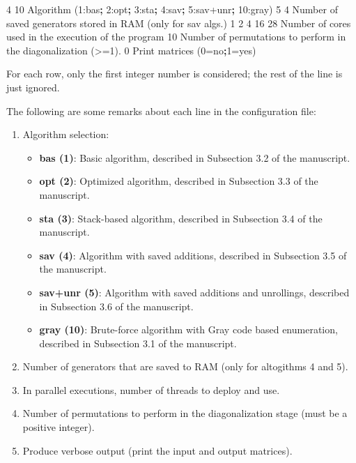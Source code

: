 \documentclass[]{article}
\newenvironment{Shaded}{}{}
\newcommand{\ExtensionTok}[1]{#1}
\newcommand{\KeywordTok}[1]{\textcolor[rgb]{0.00,0.44,0.13}{\textbf{#1}}}
\newcommand{\NormalTok}[1]{#1}
\newcommand{\OperatorTok}[1]{\textcolor[rgb]{0.40,0.40,0.40}{#1}}
\providecommand{\tightlist}{%
  \setlength{\itemsep}{0pt}\setlength{\parskip}{0pt}}
\begin{document}
\begin{Shaded}
\begin{Highlighting}[]
\ExtensionTok{4}\NormalTok{ 10         Algorithm (1:bas}\KeywordTok{;} \ExtensionTok{2}\NormalTok{:opt}\KeywordTok{;} \ExtensionTok{3}\NormalTok{:sta}\KeywordTok{;} \ExtensionTok{4}\NormalTok{:sav}\KeywordTok{;} \ExtensionTok{5}\NormalTok{:sav+unr}\KeywordTok{;} \ExtensionTok{10}\NormalTok{:gray)}
 \ExtensionTok{5}\NormalTok{ 4         Number of saved generators stored in RAM (only for sav algs.)}
\ExtensionTok{1}\NormalTok{ 2 4 16 28  Number of cores used in the execution of the program}
 \ExtensionTok{10}\NormalTok{          Number of permutations to perform in the diagonalization (}\OperatorTok{>}\NormalTok{=1)}\ExtensionTok{.}
\ExtensionTok{0}\NormalTok{            Print matrices (0=no}\KeywordTok{;}\ExtensionTok{1}\NormalTok{=yes)}
\end{Highlighting}
\end{Shaded}

For each row, only the first integer number is considered; the rest of
the line is just ignored.

The following are some remarks about each line in the configuration
file:

\begin{enumerate}
\def\labelenumi{\arabic{enumi}.}
\item
  Algorithm selection:

  \begin{itemize}
  \tightlist
  \item
    \textbf{bas (1)}: Basic algorithm, described in Subsection 3.2 of
    the manuscript.
  \item
    \textbf{opt (2)}: Optimized algorithm, described in Subsection 3.3
    of the manuscript.
  \item
    \textbf{sta (3)}: Stack-based algorithm, described in Subsection 3.4
    of the manuscript.
  \item
    \textbf{sav (4)}: Algorithm with saved additions, described in
    Subsection 3.5 of the manuscript.
  \item
    \textbf{sav+unr (5)}: Algorithm with saved additions and unrollings,
    described in Subsection 3.6 of the manuscript.
  \item
    \textbf{gray (10)}: Brute-force algorithm with Gray code based
    enumeration, described in Subsection 3.1 of the manuscript.
  \end{itemize}
\item
  Number of generators that are saved to RAM (only for altogithms 4 and
  5).
\item
  In parallel executions, number of threads to deploy and use.
\item
  Number of permutations to perform in the diagonalization stage (must
  be a positive integer).
\item
  Produce verbose output (print the input and output matrices).
\end{enumerate}
\end{document}
